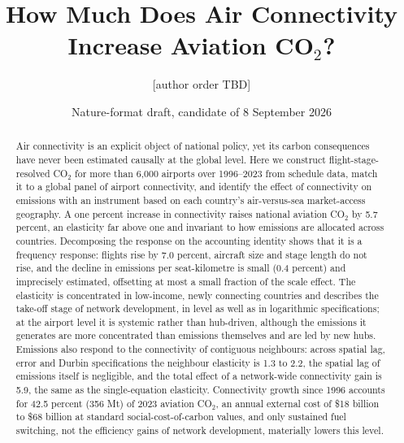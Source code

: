 \documentclass[12pt]{article}
\title{How Much Does Air Connectivity Increase Aviation CO$_2$?}
\author{[author order TBD]}
\date{Nature-format draft, candidate of 8 September 2026}
\begin{document}
\maketitle

\begin{abstract}
\noindent Air connectivity is an explicit object of national policy, yet its
carbon consequences have never been estimated causally at the global level.
Here we construct flight-stage-resolved CO$_2$ for more than 6{,}000
airports over 1996--2023 from schedule data, match it to a global panel of
airport connectivity, and identify the effect of connectivity on emissions
with an instrument based on each country's air-versus-sea market-access
geography. A one percent increase in connectivity raises national aviation
CO$_2$ by 5.7 percent, an elasticity far above one and invariant to how
emissions are allocated across countries. Decomposing the response on the
accounting identity shows that it is a frequency response: flights rise by
7.0 percent, aircraft size and stage length do not rise, and the decline in
emissions per seat-kilometre is small (0.4 percent) and imprecisely
estimated, offsetting at most a small fraction of the scale effect. 
The elasticity is concentrated in low-income, newly connecting
countries and describes the take-off stage of network development, in
level as well as in logarithmic specifications; at the airport level it is systemic rather than hub-driven,
although the emissions it generates are more concentrated than emissions
themselves and are led by new hubs. Emissions also respond to the
connectivity of contiguous neighbours: across spatial lag, error and Durbin
specifications the neighbour elasticity is 1.3 to 2.2, the spatial lag of
emissions itself is negligible, and the total effect of a network-wide
connectivity gain is 5.9, the same as the single-equation elasticity. Connectivity growth since
1996 accounts for 42.5 percent (356 Mt) of 2023 aviation CO$_2$, an annual
external cost of \$18 billion to \$68 billion at standard social-cost-of-carbon
values, and only sustained fuel switching, not the efficiency gains of
network development, materially lowers this level.
\end{abstract}

\end{document}
